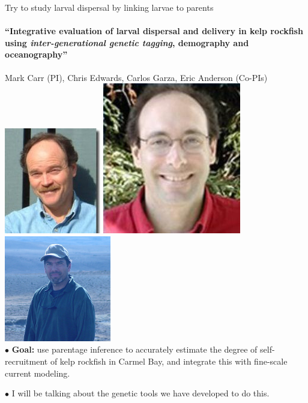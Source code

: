 \documentclass[letter,graphicx]{beamer}
\begin{document}
\begin{frame}{Try to study larval dispersal by linking larvae to parents}
\framesubtitle{``Integrative evaluation of larval dispersal and delivery in kelp rockfish using {\em inter-generational genetic tagging}, demography and
oceanography''}
{\small Mark Carr (PI), Chris Edwards, Carlos Garza, Eric Anderson (Co-PIs)}\\
\includegraphics[height=.2\textheight]{./figs/mcarr.jpg}
\includegraphics[height=.2\textheight]{./figs/cedwards.jpg}
\includegraphics[height=.2\textheight]{./figs/carlos.png} \\

$\bullet$ {\bf Goal:} use parentage inference to accurately estimate the degree of self-recruitment of kelp rockfish in Carmel Bay, and integrate this with fine-scale current modeling.

$\bullet$ I will be talking about the genetic tools we have developed to do this.
\end{frame}
\end{document}
